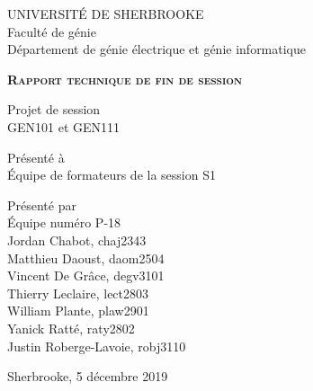 \begin{titlepage}
    \centering
    \begin{spacing}{1}
        UNIVERSITÉ DE SHERBROOKE\\
        Faculté de génie\\
        Département de génie électrique et génie informatique

        \vfill

        {\LARGE \bfseries \scshape Rapport technique de fin de session}

        \vfill

        Projet de session\\
        GEN101 et GEN111

        \vfill
    
        Présenté à\\
        Équipe de formateurs de la session S1

        \vfill

        Présenté par\\
        Équipe numéro P-18\\
        Jordan Chabot, chaj2343\\
        Matthieu Daoust, daom2504\\
        Vincent De Grâce, degv3101\\
        Thierry Leclaire, lect2803\\
        William Plante, plaw2901\\
        Yanick Ratté, raty2802\\
        Justin Roberge-Lavoie, robj3110

        \vfill

        Sherbrooke, 5 décembre 2019
    \end{spacing}
\end{titlepage}

